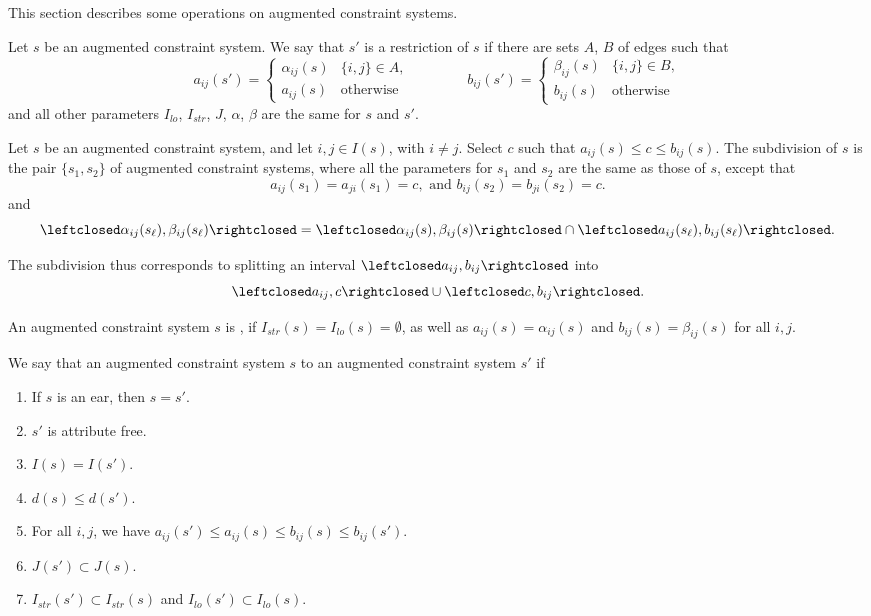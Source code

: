 This section describes some operations on augmented constraint
systems.

\begin{definition}[restriction]
Let $s$ be an augmented constraint system.
We say that $s'$ is a restriction of $s$ if there are sets $A$, $B$ of
edges such that
\[
a_{ij}(s') = 
\begin{cases}
 \alpha_{ij}(s) & \{i,j\}\in A,\\
  a_{ij}(s) & \text{otherwise}
  \end{cases}
  \qquad\qquad
b_{ij}(s') = 
\begin{cases} \beta_{ij}(s) & \{i,j\}\in B,\\
  b_{ij}(s) & \text{otherwise}
\end{cases}
\]
and all other parameters $I_{lo}$, $I_{str}$, $J$, $\alpha$, $\beta$
are
the same for $s$ and $s'$.
\end{definition}


\begin{definition}[subdivision] 
Let $s$ be an augmented constraint system,
and let $i,j\in  I(s)$, with $i\ne j$.  Select $c$ such that $a_{ij}(s)\le c\le b_{ij}(s)$.
The subdivision of $s$ is the pair $\{s_1,s_2\}$ 
of augmented constraint systems, where all the parameters for $s_1$ and $s_2$
are the same as those of $s$, except that
\[
a_{ij}(s_1)=a_{ji}(s_1) = c, \text{ and } b_{ij}(s_2) = b_{ji}(s_2)=c.
\]
and
\[
\leftclosed\alpha_{ij}(s_\ell),\beta_{ij}(s_\ell)\rightclosed =
\leftclosed\alpha_{ij}(s),\beta_{ij}(s)\rightclosed\cap
\leftclosed a_{ij}(s_\ell),b_{ij}(s_\ell)\rightclosed.
\]
\end{definition}
The subdivision thus corresponds to splitting an interval 
$\leftclosed a_{ij},b_{ij}\rightclosed$ into
\[
\leftclosed a_{ij},c\rightclosed \cup \leftclosed c,b_{ij}\rightclosed.
\]

\begin{definition}
An augmented constraint system $s$ is , if
$I_{str}(s)=I_{lo}(s)=\emptyset$, as well as
$a_{ij}(s)=\alpha_{ij}(s)$ and $b_{ij}(s)=\beta_{ij}(s)$ for all
$i,j$.
\end{definition}


\begin{definition}  
We say that an augmented constraint system $s$
 to an augmented constraint system $s'$ if
\begin{enumerate}
\item If $s$ is an ear, then $s=s'$.
\item $s'$ is attribute free.
\item $I(s) = I(s')$.
\item $d(s)\le d(s')$.
\item For all $i,j$, we have $a_{ij}(s')\le a_{ij}(s)\le b_{ij}(s)\le b_{ij}(s')$.
\item $J(s')\subset J(s)$.
\item $I_{str}(s')\subset I_{str}(s)$  and
$I_{lo}(s')\subset I_{lo}(s)$.
\end{enumerate}
\end{definition}


